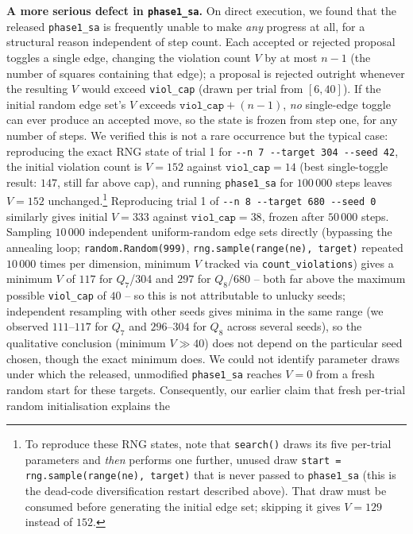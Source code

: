 \documentclass[12pt,a4paper]{article}
\theoremstyle{definition}
\begin{document}
\noindent\textbf{A more serious defect in \texttt{phase1\_sa}.} On
direct execution, we found that the released \texttt{phase1\_sa} is
frequently unable to make \emph{any} progress at all, for a structural
reason independent of step count. Each accepted or rejected proposal
toggles a single edge, changing the violation count $V$ by at most
$n-1$ (the number of squares containing that edge); a proposal is
rejected outright whenever the resulting $V$ would exceed
\texttt{viol\_cap} (drawn per trial from $[6,40]$). If the initial
random edge set's $V$ exceeds $\texttt{viol\_cap}+(n-1)$, \emph{no}
single-edge toggle can ever produce an accepted move, so the state is
frozen from step one, for any number of steps. We verified this is not
a rare occurrence but the typical case: reproducing the exact RNG state
of trial 1 for \texttt{-{}-n 7 -{}-target 304 -{}-seed 42}, the initial
violation count is $V=152$ against $\texttt{viol\_cap}=14$ (best
single-toggle result: $147$, still far above cap), and running
\texttt{phase1\_sa} for $100\,000$ steps leaves $V=152$ unchanged.\footnote{To
reproduce these RNG states, note that \texttt{search()} draws its five
per-trial parameters and \emph{then} performs one further, unused draw
\texttt{start = rng.sample(range(ne), target)} that is never passed to
\texttt{phase1\_sa} (this is the dead-code diversification restart described
above). That draw must be consumed before generating the initial edge set;
skipping it gives $V=129$ instead of $152$.}
Reproducing trial 1 of \texttt{-{}-n 8 -{}-target 680 -{}-seed 0}
similarly gives initial $V=333$ against $\texttt{viol\_cap}=38$,
frozen after $50\,000$ steps. Sampling $10\,000$ independent uniform-random
edge sets directly (bypassing the annealing loop; \texttt{random.Random(999)},
\texttt{rng.sample(range(ne), target)} repeated $10\,000$ times per
dimension, minimum $V$ tracked via \texttt{count\_violations}) gives a
minimum $V$
of $117$ for $Q_7$/304 and $297$ for $Q_8$/680 -- both far above the
maximum possible \texttt{viol\_cap} of $40$ -- so this is not
attributable to unlucky seeds; independent resampling with other seeds
gives minima in the same range (we observed $111$--$117$ for $Q_7$ and
$296$--$304$ for $Q_8$ across several seeds), so the qualitative
conclusion (minimum $V\gg40$) does not depend on the particular seed
chosen, though the exact minimum does. We could not identify parameter draws
under which the released, unmodified \texttt{phase1\_sa} reaches
$V=0$ from a fresh random start for these targets. Consequently, our
earlier claim that fresh per-trial random initialisation explains the
\end{document}
